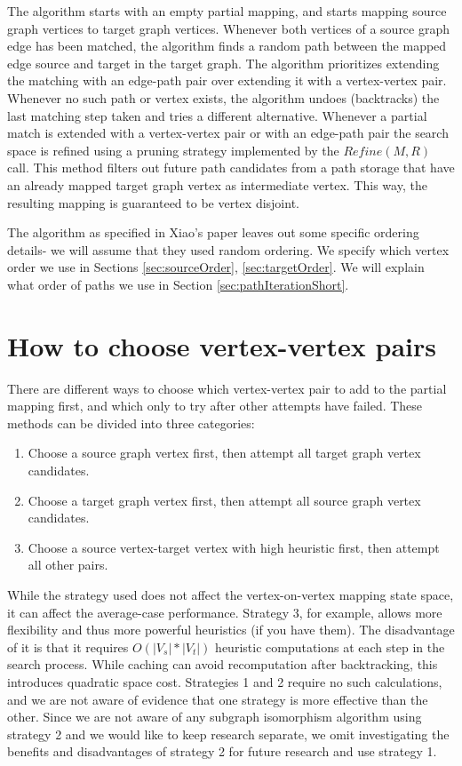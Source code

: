 The algorithm starts with an empty partial mapping, and starts mapping source graph vertices to target graph vertices. Whenever both vertices of a source graph edge has been matched, the algorithm finds a random path between the mapped edge source and target in the target graph. The algorithm prioritizes extending the matching with an edge-path pair over extending it with a vertex-vertex pair. Whenever no such path or vertex exists, the algorithm undoes (backtracks) the last matching step taken and tries a different alternative. Whenever a partial match is extended with a vertex-vertex pair or with an edge-path pair the search space is refined using a pruning strategy implemented by the $Refine(M,R)$ call. This method filters out future path candidates from a path storage that have an already mapped target graph vertex as intermediate vertex. This way, the resulting mapping is guaranteed to be vertex disjoint.

The algorithm as specified in Xiao's paper leaves out some specific ordering details- we will assume that they used random ordering. We specify which vertex order we use in Sections \ref{sec:sourceOrder}, \ref{sec:targetOrder}. We will explain what order of paths we use in Section \ref{sec:pathIterationShort}.

\section{How to choose vertex-vertex pairs}
There are different ways to choose which vertex-vertex pair to add to the partial mapping first, and which only to try after other attempts have failed. These methods can be divided into three categories:

\begin{enumerate}
\item Choose a source graph vertex first, then attempt all target graph vertex candidates.
\item Choose a target graph vertex first, then attempt all source graph vertex candidates.
\item Choose a source vertex-target vertex with high heuristic first, then attempt all other pairs.
\end{enumerate}

While the strategy used does not affect the vertex-on-vertex mapping state space, it can affect the average-case performance. Strategy 3, for example, allows more flexibility and thus more powerful heuristics (if you have them). The disadvantage of it is that it requires $O(|V_s|*|V_t|)$ heuristic computations at each step in the search process. While caching can avoid recomputation after backtracking, this introduces quadratic space cost. Strategies 1 and 2 require no such calculations, and we are not aware of evidence that one strategy is more effective than the other. Since we are not aware of any subgraph isomorphism algorithm using strategy 2 and we would like to keep research separate, we omit investigating the benefits and disadvantages of strategy 2 for future research and use strategy 1.

